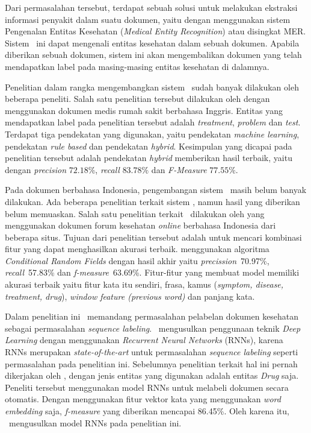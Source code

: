 	Dari permasalahan tersebut, terdapat sebuah solusi untuk melakukan ekstraksi informasi penyakit dalam suatu dokumen, yaitu dengan menggunakan sistem Pengenalan Entitas Kesehatan (\textit{Medical Entity Recognition}) atau disingkat MER. Sistem \mer~ini dapat mengenali entitas kesehatan dalam sebuah dokumen. Apabila diberikan sebuah dokumen, sistem ini akan mengembalikan dokumen yang telah mendapatkan label pada masing-masing entitas kesehatan di dalamnya.
	
	Penelitian dalam rangka mengembangkan sistem \mer~sudah banyak dilakukan oleh beberapa peneliti. Salah satu penelitian tersebut dilakukan oleh \cite{abacha2011medical} dengan menggunakan dokumen medis rumah sakit berbahasa Inggris. Entitas yang mendapatkan label pada penelitian tersebut adalah \textit{treatment}, \textit{problem} dan \textit{test}. Terdapat tiga pendekatan yang digunakan, yaitu pendekatan \textit{machine learning}, pendekatan \textit{rule based} dan pendekatan \textit{hybrid}. Kesimpulan yang dicapai pada penelitian tersebut adalah pendekatan \textit{hybrid} memberikan hasil terbaik, yaitu dengan \textit{precision} $ 72.18\% $, \textit{recall} $ 83.78\% $ dan \textit{F-Measure} $ 77.55\% $.
		
	Pada dokumen berbahasa Indonesia, pengembangan sistem \mer~masih belum banyak dilakukan. Ada beberapa penelitian terkait sistem \mer, namun hasil yang diberikan belum memuaskan. Salah satu penelitian terkait \mer~dilakukan oleh \cite{skripsiKakRadit} yang menggunakan dokumen forum kesehatan \textit{online} berbahasa Indonesia dari beberapa situs. Tujuan dari penelitian tersebut adalah untuk mencari kombinasi fitur yang dapat menghasilkan akurasi terbaik. \cite{skripsiKakRadit} menggunakan algoritma \textit{Conditional Random Fields} dengan hasil akhir yaitu \textit{precission}~70.97\%, \textit{recall}~57.83\% dan \textit{f-measure}~63.69\%. Fitur-fitur yang membuat model memiliki akurasi terbaik yaitu fitur kata itu sendiri, frasa, kamus (\textit{symptom, disease, treatment, drug}), \textit{window feature (previous word)} dan panjang kata.
	
	Dalam penelitian ini \saya~memandang permasalahan pelabelan dokumen kesehatan sebagai permasalahan \textit{sequence labeling}. \Saya~mengusulkan penggunaan teknik \textit{Deep Learning} dengan menggunakan \textit{Recurrent Neural Networks} (RNNs), karena RNNs merupakan \textit{state-of-the-art} untuk permasalahan \textit{sequence labeling} seperti permasalahan pada penelitian ini. Sebelumnya penelitian terkait hal ini pernah dikerjakan oleh \cite{mujiono2016new}, dengan jenis entitas yang digunakan adalah entitas \textit{Drug} saja. Peneliti tersebut menggunakan model RNNs untuk melabeli dokumen secara otomatis. Dengan menggunakan fitur vektor kata yang menggunakan \textit{word embedding} saja, \textit{f-measure} yang diberikan mencapai 86.45\%. Oleh karena itu, \saya~mengusulkan model RNNs pada penelitian ini.
		
